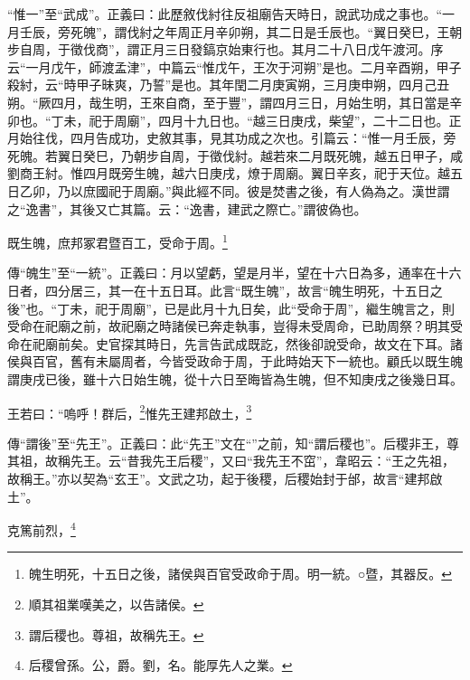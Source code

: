 {\noindent\shu{}\fzkt “惟一”至“武成”。正義曰：此歷敘伐紂往反祖廟告天時日，說武功成之事也。“一月壬辰，旁死魄”，謂伐紂之年周正月辛卯朔，其二日是壬辰也。“翼日癸巳，王朝步自周，于徵伐商”，謂正月三日發鎬京始東行也。其月二十八日戊午渡河。序云“一月戊午，師渡孟津”，中篇云“惟戊午，王次于河朔”是也。二月辛酉朔，甲子殺紂，云“時甲子昧爽，乃誓”是也。其年閏二月庚寅朔，三月庚申朔，四月己丑朔。“厥四月，哉生明，王來自商，至于豐”，謂四月三日，月始生明，其日當是辛卯也。“丁未，祀于周廟”，四月十九日也。“越三日庚戌，柴望”，二十二日也。正月始往伐，四月告成功，史敘其事，見其功成之次也。引篇云：“惟一月壬辰，旁死魄。若翼日癸巳，乃朝步自周，于徵伐紂。越若來二月既死魄，越五日甲子，咸劉商王紂。惟四月既旁生魄，越六日庚戌，燎于周廟。翼日辛亥，祀于天位。越五日乙卯，乃以庶國祀于周廟。”與此經不同。彼是焚書之後，有人偽為之。漢世謂之“逸書”，其後又亡其篇。云：“逸書，建武之際亡。”謂彼偽也。 \par}

既生魄，庶邦冢君暨百工，受命于周。\footnote{魄生明死，十五日之後，諸侯與百官受政命于周。明一統。○暨，其器反。}

{\noindent\zhuan{}\fzbyks 傳“魄生”至“一統”。正義曰：月以望虧，望是月半，望在十六日為多，通率在十六日者，四分居三，其一在十五日耳。此言“既生魄”，故言“魄生明死，十五日之後”也。“丁未，祀于周廟”，已是此月十九日矣，此“受命于周”，繼生魄言之，則受命在祀廟之前，故祀廟之時諸侯已奔走執事，豈得未受周命，已助周祭？明其受命在祀廟前矣。史官探其時日，先言告武成既訖，然後卻說受命，故文在下耳。諸侯與百官，舊有未屬周者，今皆受政命于周，于此時始天下一統也。顧氏以既生魄謂庚戌已後，雖十六日始生魄，從十六日至晦皆為生魄，但不知庚戌之後幾日耳。 \par}

王若曰：“嗚呼！群后，\footnote{順其祖業嘆美之，以告諸侯。}惟先王建邦啟土，\footnote{謂后稷也。尊祖，故稱先王。}

{\noindent\zhuan{}\fzbyks 傳“謂後”至“先王”。正義曰：此“先王”文在“”之前，知“謂后稷也”。后稷非王，尊其祖，故稱先王。云“昔我先王后稷”，又曰“我先王不窋”，韋昭云：“王之先祖，故稱王。”亦以契為“玄王”。文武之功，起于後稷，后稷始封于邰，故言“建邦啟土”。 \par}

克篤前烈，\footnote{后稷曾孫。公，爵。劉，名。能厚先人之業。}


